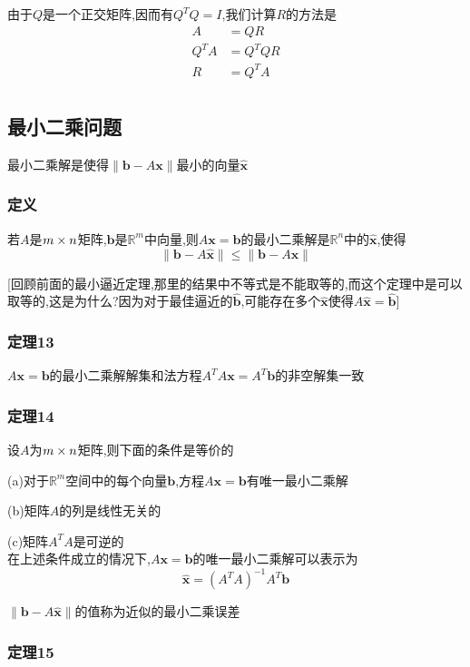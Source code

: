 \documentclass{article}
\newcommand{\RR}{\mathbb{R}}
\newcommand{\ve}{\boldsymbol}
\begin{document}
\begin{CJK}{UTF8}{gkai}
由于$Q$是一个正交矩阵,因而有$Q^T Q = I$,我们计算$R$的方法是
\[
\begin{aligned}    
A &= QR \\
Q^T A &= Q^T Q R\\
R &= Q^T A\\
\end{aligned}
\]
\subsection{最小二乘问题}
最小二乘解是使得$\|\ve{b} - A\ve{x}\|$最小的向量$\hat{\ve{x}}$\\

\subsubsection{定义}
若$A$是$m\times n$矩阵,$\ve{b}$是$\RR^m$中向量,则$A\ve{x} = \ve{b}$的最小二乘解是$\RR^n$中的$\hat{\ve{x}}$,使得
\[\|\ve{b} - A\hat{\ve{x}}\| \leq \|\ve{b} - A\ve{x}\|\]

[回顾前面的最小逼近定理,那里的结果中不等式是不能取等的,而这个定理中是可以取等的,这是为什么?因为对于最佳逼近的$\hat{\ve{b}}$,可能存在多个$\hat{\ve{x}}$使得$A \hat{\ve{x}} = \hat{\ve{b}}$]\\

\subsubsection{定理13}
$A\ve{x} = \ve{b}$的最小二乘解解集和法方程$A^T A\ve{x} = A^T \ve{b}$的非空解集一致\\

\subsubsection{定理14}

设$A$为$m\times n$矩阵,则下面的条件是等价的

(a)对于$\RR^m$空间中的每个向量$\ve{b}$,方程$A\ve{x} = \ve{b}$有唯一最小二乘解

(b)矩阵$A$的列是线性无关的

(c)矩阵$A^T A$是可逆的\\

在上述条件成立的情况下,$A\ve{x} = \ve{b}$的唯一最小二乘解可以表示为
\[\hat{\ve{x}} = (A^T A)^{-1} A^T \ve{b}\]

$\|\ve{b} - A \hat{\ve{x}}\|$的值称为近似的最小二乘误差\\

\subsubsection{定理15}


\end{CJK}
\end{document}
